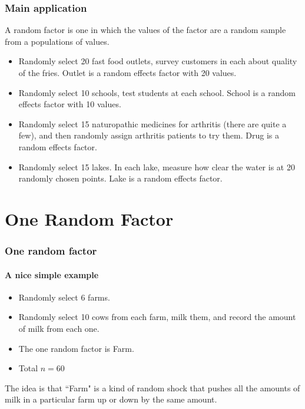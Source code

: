 \documentclass[serif]{beamer} %
\begin{document}
\begin{frame}
\frametitle{Main application}
A random factor is one in which the values of the factor are a random sample from a populations of values.
  \begin{itemize}
    \item Randomly select 20 fast food outlets, survey customers in each about quality of the fries. Outlet is a random effects factor with 20 values. %
    \item Randomly select 10 schools, test students at each school. School is a random effects factor with 10 values.
    \item Randomly select 15 naturopathic medicines for arthritis (there are quite a few), and then randomly assign arthritis patients to try them. Drug is a random effects factor.
    \item Randomly select 15 lakes. In each lake, measure how clear the water is at 20 randomly chosen points. Lake is a random effects factor.
  \end{itemize}
\end{frame}



\section{One Random Factor}

\begin{frame}
\frametitle{One random factor}
\framesubtitle{A nice simple example} 
  \begin{itemize}
    \item Randomly select 6 farms.
    \item Randomly select 10 cows from each farm, milk them, and record the amount of milk from each one.
    \item The one random factor is Farm.
    \item Total $n=60$
  \end{itemize}
  
The idea is that ``Farm" is a kind of random shock that pushes all the amounts of milk in a particular farm up or down by the same amount. 

\end{frame}
\end{document}
